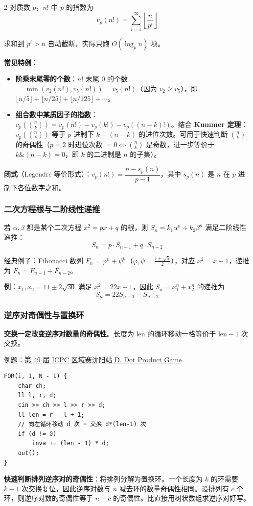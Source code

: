 \begin{multicols*}{2}
		对质数 $p$，$n!$ 中 $p$ 的指数为
		$$v_p(n!) = \sum_{i = 1}^{\infty} \left\lfloor \frac{n}{p^i} \right\rfloor$$

		求和到 $p^i > n$ 自动截断，实际只跑 $O(\log_p n)$ 项。

		\textbf{常见特例}：
		\begin{itemize}
			\item \textbf{阶乘末尾零的个数}：$n!$ 末尾 $0$ 的个数 $= \min(v_2(n!), v_5(n!)) = v_5(n!)$（因为 $v_2 \ge v_5$），即 $\lfloor n/5 \rfloor + \lfloor n/25 \rfloor + \lfloor n/125 \rfloor + \cdots$。
			\item \textbf{组合数中某质因子的指数}：$v_p\!\left(\binom{n}{k}\right) = v_p(n!) - v_p(k!) - v_p((n-k)!)$。结合 \textbf{Kummer 定理}：$v_p\!\left(\binom{n}{k}\right)$ 等于 $p$ 进制下 $k + (n - k)$ 的进位次数。可用于快速判断 $\binom{n}{k}$ 的奇偶性（$p = 2$ 时进位次数 $= 0 \iff \binom{n}{k}$ 是奇数，进一步等价于 $k \mathbin{\&} (n - k) = 0$，即 $k$ 的二进制是 $n$ 的子集）。
		\end{itemize}

		\textbf{闭式}（Legendre 等价形式）：$v_p(n!) = \dfrac{n - s_p(n)}{p - 1}$，其中 $s_p(n)$ 是 $n$ 在 $p$ 进制下各位数字之和。

		\subsubsection{二次方程根与二阶线性递推}

		若 $\alpha, \beta$ 都是某个二次方程 $x^2 = px + q$ 的根，则 $S_n = k_1 \alpha^n + k_2 \beta^n$ 满足二阶线性递推：
		$$S_n = p \cdot S_{n-1} + q \cdot S_{n-2}$$

		经典例子：Fibonacci 数列 $F_n = \varphi^n + \psi^n$（$\varphi, \psi = \frac{1 \pm \sqrt{5}}{2}$），对应 $x^2 = x + 1$，递推为 $F_n = F_{n-1} + F_{n-2}$。

		\textbf{例}：$x_1, x_2 = 11 \pm 2\sqrt{30}$ 满足 $x^2 = 22x - 1$，因此 $S_n = x_1^n + x_2^n$ 的递推为
		$$S_n = 22 S_{n-1} - S_{n-2}$$

		\subsubsection{逆序对奇偶性与置换环}

		\textbf{交换一定改变逆序对数量的奇偶性}。长度为 $\mathrm{len}$ 的循环移动一格等价于 $\mathrm{len} - 1$ 次交换。

		例题：\href{https://codeforces.com/gym/105576/problem/D}{第 49 届 ICPC 区域赛沈阳站 D. Dot Product Game}

		\begin{verbatim}
FOR(i, 1, N - 1) {
	char ch;
	ll l, r, d;
	cin >> ch >> l >> r >> d;
	ll len = r - l + 1;
	// 向左循环移动 d 次 = 交换 d*(len-1) 次
	if (d != 0)
		inva += (len - 1) * d;
	out();
}
		\end{verbatim}

		\textbf{快速判断排列逆序对的奇偶性}：将排列分解为置换环。一个长度为 $k$ 的环需要 $k - 1$ 次交换复位，因此逆序对数与 $n$ 减去环的数量奇偶性相同。设排列有 $c$ 个环，则逆序对数的奇偶性等于 $n - c$ 的奇偶性。比直接用树状数组求逆序对好写。

	\end{multicols*}

